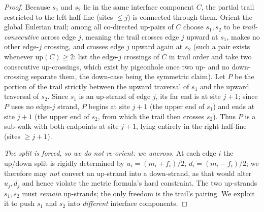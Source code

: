 \begin{proof}
Because $s_1$ and $s_2$ lie in the same interface component $C$, the partial
trail restricted to the left half-line (sites $\le j$) is connected through
them.  Orient the global Eulerian trail; among all co-directed up-pairs of
$C$ choose $s_1,s_2$ to be \emph{trail-consecutive} across edge $j$, meaning
the trail crosses edge $j$ upward at $s_1$, makes no other edge-$j$ crossing,
and crosses edge $j$ upward again at $s_2$ (such a pair exists whenever
$\mathrm{up}(C)\ge2$: list the edge-$j$ crossings of $C$ in trail order and
take two consecutive up-crossings, which exist by pigeonhole once two up- and
no down-crossing separate them, the down-case being the symmetric claim).
Let $P$ be the portion of the trail strictly between the upward traversal of
$s_1$ and the upward traversal of $s_2$.  Since $s_1$ is an up-strand of edge
$j$, its far end is at site $j+1$; since $P$ uses no edge-$j$ strand, $P$
begins at site $j+1$ \textup{(}the upper end of $s_1$\textup{)} and ends at
site $j+1$ \textup{(}the upper end of $s_2$, from which the trail then
crosses $s_2$\textup{)}.  Thus $P$ is a sub-walk with both endpoints at site
$j+1$, lying entirely in the right half-line (sites $\ge j+1$).

\emph{The split is forced, so we do not re-orient: we uncross.}
At each edge $i$ the up/down split is rigidly determined by
$u_i=(m_i+f_i)/2$, $d_i=(m_i-f_i)/2$; we therefore may \emph{not} convert an
up-strand into a down-strand, as that would alter $u_j,d_j$ and hence violate
the metric formula's hard constraint.  The two up-strands $s_1,s_2$ must
\emph{remain} up-strands; the only freedom is the trail's pairing.  We exploit
it to push $s_1$ and $s_2$ into \emph{different} interface components.


\end{proof}
